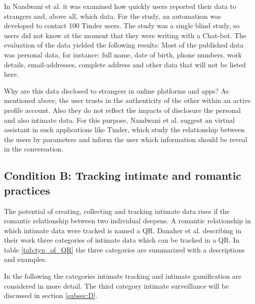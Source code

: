 In Nandwani et al. \cite{10.1007/978-3-319-61542-4_32} it was examined how quickly users reported their data to strangers and, above all, which data. For the study, an automatism was developed to contact 100 Tinder users. The study was a single blind study, so users did not know at the moment that they were writing with a Chat-bot. The evaluation of the data yielded the following results: Most of the published data was personal data, for instance: full name, date of birth, phone numbers, work details, email-addresses, complete address and other data that will not be listed here.

Why are this data disclosed to strangers in online platforms and apps? As mentioned above, the user trusts in the authenticity of the other within an active profile account. Also they do not reflect the impacts of disclosure the personal and also intimate data. For this purpose, Nandwani et al. \cite{10.1007/978-3-319-61542-4_32} suggest an virtual assistant in such applications like Tinder, which study the relationship between the users by parameters and inform the user which information should be reveal in the conversation.

\subsection{Condition B: Tracking intimate and romantic practices}
\label{subsec:B}
The potential of creating, collecting and tracking intimate data rises if the romantic relationship between two individual deepens. A romantic relationship in which intimate data were tracked is named a \ac{QR}.
Danaher et al. \cite{doi:10.1080/15265161.2017.1409823} describing in their work three categories of intimate data which can be tracked in a \acs{QR}. In table \ref{tab:typ_of_QR} the three categories are summarized with a descriptions and examples.

In the following the categories intimate tracking and intimate gamification are considered in more detail.
The third category intimate surveillance will be discussed in section \ref{subsec:D}.

